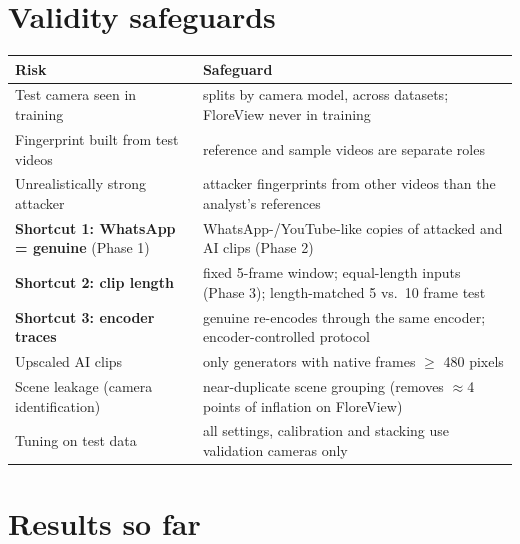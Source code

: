 \documentclass[11pt,a4paper]{article}
\begin{document}
\section{Validity safeguards}\label{sec:validity}
\begin{table}[H]\centering\small
\begin{tabularx}{\linewidth}{lY}\toprule
Risk & Safeguard \\\midrule
Test camera seen in training & splits by camera model, across datasets; FloreView never in training \\
Fingerprint built from test videos & reference and sample videos are separate roles \\
Unrealistically strong attacker & attacker fingerprints from other videos than the analyst's references \\
\textbf{Shortcut 1: WhatsApp = genuine} (Phase 1) & WhatsApp-/YouTube-like copies of attacked and AI clips (Phase 2) \\
\textbf{Shortcut 2: clip length} & fixed 5-frame window; equal-length inputs (Phase 3); length-matched 5 vs.\ 10 frame test \\
\textbf{Shortcut 3: encoder traces} & genuine re-encodes through the same encoder; encoder-controlled protocol \\
Upscaled AI clips & only generators with native frames $\ge$ 480 pixels \\
Scene leakage (camera identification) & near-duplicate scene grouping (removes $\approx$4 points of inflation on FloreView) \\
Tuning on test data & all settings, calibration and stacking use validation cameras only \\\bottomrule
\end{tabularx}\end{table}

\section{Results so far}\label{sec:results}
\end{document}
